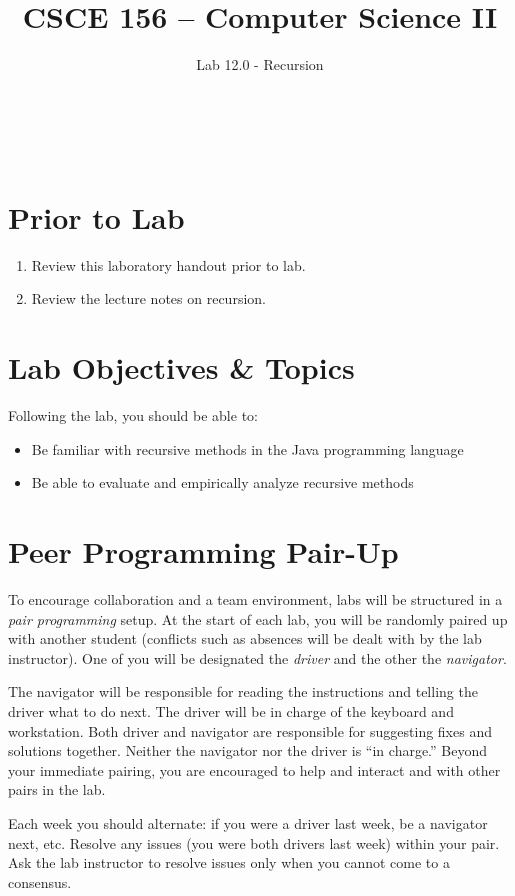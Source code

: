 \documentclass[12pt]{scrartcl}
\title{CSCE 156 -- Computer Science II}
\subtitle{Lab 12.0 - Recursion}
\author{~}
\date{~}
\begin{document}
\maketitle

\section*{Prior to Lab}

\begin{enumerate}
  \item Review this laboratory handout prior to lab.
  \item Review the lecture notes on recursion.
\end{enumerate}

\section*{Lab Objectives \& Topics}
Following the lab, you should be able to:
\begin{itemize}
  \item Be familiar with recursive methods in the Java programming 
    language
  \item Be able to evaluate and empirically analyze recursive methods
\end{itemize}


\section*{Peer Programming Pair-Up}

To encourage collaboration and a team environment, labs will be
structured in a \emph{pair programming} setup.  At the start of
each lab, you will be randomly paired up with another student 
(conflicts such as absences will be dealt with by the lab instructor).
One of you will be designated the \emph{driver} and the other
the \emph{navigator}.  

The navigator will be responsible for reading the instructions and
telling the driver what to do next.  The driver will be in charge of the
keyboard and workstation.  Both driver and navigator are responsible
for suggesting fixes and solutions together.  Neither the navigator
nor the driver is ``in charge.''  Beyond your immediate pairing, you
are encouraged to help and interact and with other pairs in the lab.

Each week you should alternate: if you were a driver last week, 
be a navigator next, etc.  Resolve any issues (you were both drivers
last week) within your pair.  Ask the lab instructor to resolve issues
only when you cannot come to a consensus.  
\end{document}
